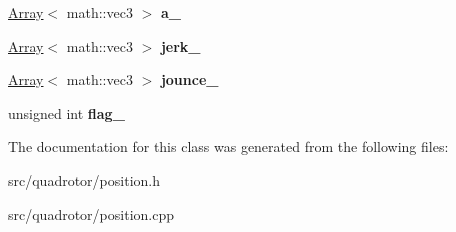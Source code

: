 \begin{DoxyCompactItemize}
\item 
\hypertarget{classPosition_a120045c4cd1e2c9a4f1f7a3587681b1f}{\hyperlink{classArray}{\-Array}$<$ math\-::vec3 $>$ {\bfseries a\-\_\-}}\label{classPosition_a120045c4cd1e2c9a4f1f7a3587681b1f}

\item 
\hypertarget{classPosition_af739ad03cbe3d29eee7aa0631d1e3c1f}{\hyperlink{classArray}{\-Array}$<$ math\-::vec3 $>$ {\bfseries jerk\-\_\-}}\label{classPosition_af739ad03cbe3d29eee7aa0631d1e3c1f}

\item 
\hypertarget{classPosition_a5f22c101e8a63183849a30ede8308b04}{\hyperlink{classArray}{\-Array}$<$ math\-::vec3 $>$ {\bfseries jounce\-\_\-}}\label{classPosition_a5f22c101e8a63183849a30ede8308b04}

\item 
\hypertarget{classPosition_a940b73c924b7a90b293f733ea168da7e}{unsigned int {\bfseries flag\-\_\-}}\label{classPosition_a940b73c924b7a90b293f733ea168da7e}

\end{DoxyCompactItemize}


\-The documentation for this class was generated from the following files\-:\begin{DoxyCompactItemize}
\item 
src/quadrotor/position.\-h\item 
src/quadrotor/position.\-cpp\end{DoxyCompactItemize}

